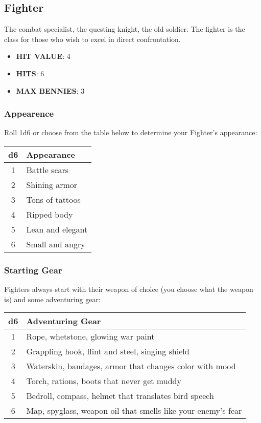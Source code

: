 \newpage
\subsection{Fighter}
The combat specialist, the questing knight, the old soldier. The fighter is the class for those who wish to excel in direct confrontation.

\begin{multicols}{2}
\begin{itemize}
  \item \textbf{HIT VALUE}: 4
  \item \textbf{HITS}: 6
  \item \textbf{MAX BENNIES}: 3
\end{itemize}

\subsubsection*{Appearence}
Roll 1d6 or choose from the table below to determine your Fighter's appearance:

\begin{adjustbox}{width=0.45\columnwidth,center}
\begin{tabular}{|c|l|}
\hline
\textbf{d6} & \textbf{Appearance} \\
\hline
1 & Battle scars \\
2 & Shining armor \\
3 & Tons of tattoos \\
4 & Ripped body \\
5 & Lean and elegant \\
6 & Small and angry \\
\hline
\end{tabular}
\end{adjustbox}

\subsubsection*{Starting Gear}
Fighters always start with their weapon of choice (you choose what the weapon is) and some adventuring gear:

\begin{adjustbox}{width=\columnwidth,center}
\begin{tabular}{|c|l|}
\hline
\textbf{d6} & \textbf{Adventuring Gear} \\
\hline
1 & Rope, whetstone, glowing war paint \\
2 & Grappling hook, flint and steel, singing shield \\
3 & Waterskin, bandages, armor that changes color with mood \\
4 & Torch, rations, boots that never get muddy \\
5 & Bedroll, compass, helmet that translates bird speech \\
6 & Map, spyglass, weapon oil that smells like your enemy's fear \\
\hline
\end{tabular}
\end{adjustbox}


\end{multicols}
